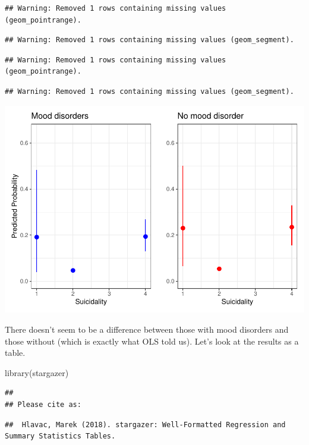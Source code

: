 \documentclass[
]{article}
\newenvironment{Shaded}{\begin{snugshade}}{\end{snugshade}}
\newcommand{\FunctionTok}[1]{\textcolor[rgb]{0.00,0.00,0.00}{#1}}
\newcommand{\NormalTok}[1]{#1}
\begin{document}
\begin{verbatim}
## Warning: Removed 1 rows containing missing values (geom_pointrange).
\end{verbatim}

\begin{verbatim}
## Warning: Removed 1 rows containing missing values (geom_segment).
\end{verbatim}

\begin{verbatim}
## Warning: Removed 1 rows containing missing values (geom_pointrange).
\end{verbatim}

\begin{verbatim}
## Warning: Removed 1 rows containing missing values (geom_segment).
\end{verbatim}

\includegraphics{MLE_3_files/figure-latex/graph-1.pdf}

There doesn't seem to be a difference between those with mood disorders
and those without (which is exactly what OLS told us). Let's look at the
results as a table.

\begin{Shaded}
\begin{Highlighting}[]
\FunctionTok{library}\NormalTok{(stargazer)}
\end{Highlighting}
\end{Shaded}

\begin{verbatim}
## 
## Please cite as:
\end{verbatim}

\begin{verbatim}
##  Hlavac, Marek (2018). stargazer: Well-Formatted Regression and Summary Statistics Tables.
\end{verbatim}
\end{document}
